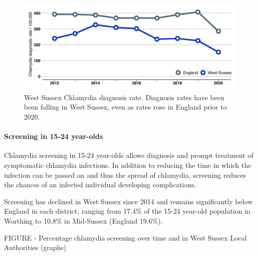 \begin{figure}[ht]
    \caption{West Sussex Chlamydia diagnosis rate. Diagnosis rates have been been falling in West Sussex, even as rates rose in England prior to 2020.}\label{fig:ct_diagnosis}
    \centering
    \includegraphics[width = \linewidth]{images/ct_diag_line.png}
\end{figure}

\paragraph{Screening in 15-24 year-olds} Chlamydia screening in 15-24 year-olds allows diagnosis and prompt treatment of symptomatic chlamydia infections. In addition to reducing the time in which the infection can be passed on and thus the spread of chlamydia, screening reduces the chances of an infected individual developing complications.

Screening has declined in West Sussex since 2014 and remains significantly below England in each district, ranging from 17.4\% of the 15-24 year-old population in Worthing to 10.8\% in Mid-Sussex (England 19.6\%).

FIGURE - Percentage chlamydia screening over time and in West Sussex Local Authorities (graphs)



